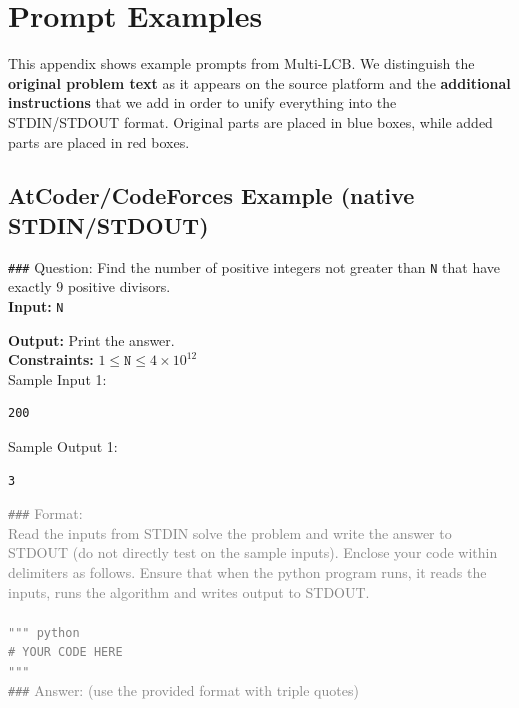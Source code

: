 \documentclass{article} %
\begin{document}
\section{Prompt Examples}
\label{app_prompts}



This appendix shows example prompts from Multi-LCB. 
We distinguish the \textbf{original problem text} as it appears on the source platform and the \textbf{additional instructions} that we add in order to unify everything into the STDIN/STDOUT format. 
Original parts are placed in blue boxes, while added parts are placed in red boxes.



\subsection{AtCoder/CodeForces Example (native STDIN/STDOUT)}
\label{app_atcoder_prompts}

\begin{origtext}
\texttt{\#\#\#} Question:  
Find the number of positive integers not greater than \texttt{N} that have exactly $9$ positive divisors.\\

\textbf{Input:}  
\texttt{N} 

\textbf{Output:}  
Print the answer.\\  

\textbf{Constraints:}  
$1 \leq \texttt{N} \leq 4 \times 10^{12}$  \\

Sample Input 1: 
\begin{verbatim}
200  
\end{verbatim}
Sample Output 1:  
\begin{verbatim}
3
\end{verbatim}
\end{origtext}

\begin{addedtext}

\textcolor{gray}{
\texttt{\#\#\#} Format: \\ 
Read the inputs from STDIN solve the problem and write the answer to STDOUT (do not directly test on the sample inputs). Enclose your code within delimiters as follows. Ensure that when the python program runs, it reads the inputs, runs the algorithm and writes output to STDOUT.}\\
\\
\textcolor{gray}{
\texttt{""" python } \\
\texttt{\# YOUR CODE HERE} \\
\texttt{"""} }
\\

\textcolor{gray}{
\texttt{\#\#\#} Answer: (use the provided format with triple quotes)}
\end{addedtext}
\end{document}
